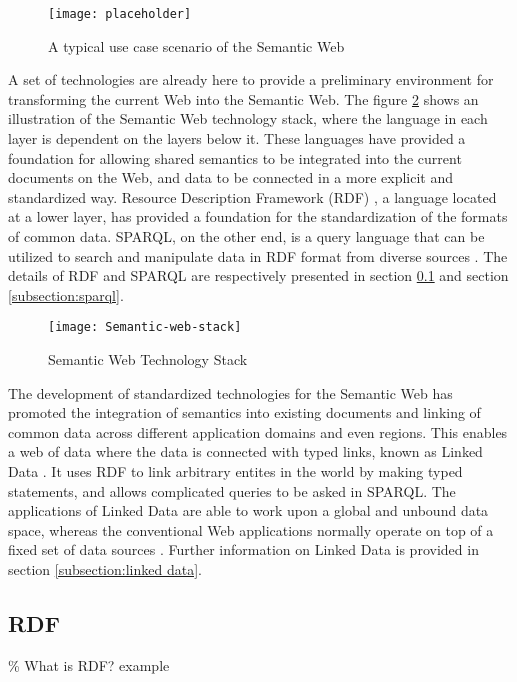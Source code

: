 \begin{figure}[h]
\centering
\texttt{[image: placeholder]}
\caption{A typical use case scenario of the Semantic Web}
\label{figure:usecase1}
\end{figure}

A set of technologies are already here to provide a preliminary environment for transforming the current Web into the Semantic Web. The figure \ref{figure:semantic web stack} shows an illustration of the Semantic Web technology stack, where the language in each layer is dependent on the layers below it. These languages have provided a foundation for allowing shared semantics to be integrated into the current documents on the Web, and data to be connected in a more explicit and standardized way. Resource Description Framework (RDF) \cite{Cyganiak2014}, a language located at a lower layer, has provided a foundation for the standardization of the formats of common data. SPARQL, on the other end, is a query language that can be utilized to search and manipulate data in RDF format from diverse sources \cite{Harris2013}. The details of RDF and SPARQL are respectively presented in section \ref{subsection:rdf} and section \ref{subsection:sparql}.

\begin{figure}[h]
\texttt{[image: Semantic-web-stack]}
\centering
\caption{Semantic Web Technology Stack}
\label{figure:semantic web stack}
\end{figure}

The development of standardized technologies for the Semantic Web has promoted the integration of semantics into existing documents and linking of common data across different application domains and even regions. This enables a web of data where the data is connected with typed links, known as Linked Data \cite{Bizer2009}. It uses RDF to link arbitrary entites in the world by making typed statements, and allows complicated queries to be asked in SPARQL. The applications of Linked Data are able to work upon a global and unbound data space, whereas the conventional Web applications normally operate on top of a fixed set of data sources \cite{Bizer2009}. Further information on Linked Data is provided in section \ref{subsection:linked data}.

\subsection{RDF} \label{subsection:rdf}
\% What is RDF? example

